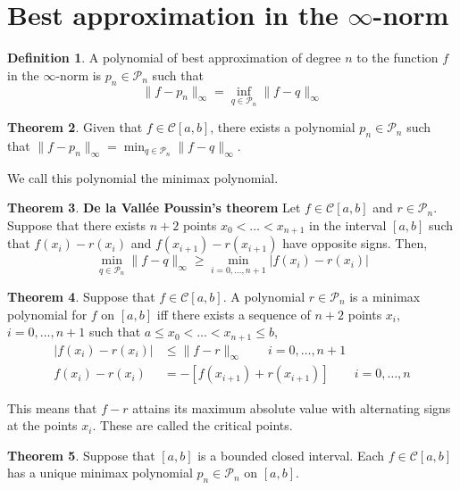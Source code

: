 \documentclass[12pt, openany]{report}
\theoremstyle{definition}
\newtheorem{thm}{Theorem}[chapter]
\newtheorem{definition}[thm]{Definition}
\begin{document}
\section{Best approximation in the \texorpdfstring{$\infty$}{infinity}-norm}
\begin{definition}
    A polynomial of best approximation of degree $n$ to the function $f$ in the $\infty$-norm is $p_n\in \mathcal{P}_n$ such that 
    \begin{equation}
        \lVert f-p_n\rVert_\infty = \inf_{q\in \mathcal{P}_n} \lVert f-q\rVert_\infty
    \end{equation}
\end{definition}
\begin{thm}
    Given that $f\in \mathcal{C}[a,b]$, there exists a polynomial $p_n\in \mathcal{P}_n$ such that $\lVert f-p_n\rVert_\infty = \min_{q\in \mathcal{P}_n} \lVert f-q\rVert_\infty$.
\end{thm}
We call this polynomial the minimax polynomial.
\begin{thm}\textbf{De la Vall\'ee Poussin's theorem}
    Let $f\in \mathcal{C}[a,b]$ and $r\in \mathcal{P}_n$. Suppose that there exists $n+2$ points $x_0<\dots<x_{n+1}$ in the interval $[a,b]$ such that $f(x_i)-r(x_i)$ and $f(x_{i+1})-r(x_{i+1})$ have opposite signs. Then,
    \begin{equation}
        \min_{q\in \mathcal{P}_n} \lVert f-q\rVert_\infty \ge \min_{i=0,\dots,n+1} |f(x_i)-r(x_i)|
    \end{equation}
\end{thm}
\begin{thm}
    Suppose that $f\in \mathcal{C}[a,b]$. A polynomial $r\in \mathcal{P}_n$ is a minimax polynomial for $f$ on $[a,b]$ iff there exists a sequence of $n+2$ points $x_i$, $i=0,\dots,n+1$ such that $a\le x_0<\dots<x_{n+1}\le b$, 
    \begin{equation}
        \begin{aligned}
            |f(x_i)-r(x_i)| &\le \lVert f-r\rVert_\infty \qquad i=0,\dots,n+1\\
            f(x_i)-r(x_i) &= - [f(x_{i+1})+r(x_{i+1})] \qquad i=0,\dots,n
        \end{aligned}
    \end{equation}
\end{thm}
This means that $f-r$ attains its maximum absolute value with alternating signs at the points $x_i$. These are called the critical points. 
\begin{thm}
    Suppose that $[a,b]$ is a bounded closed interval. Each $f\in \mathcal{C}[a,b]$ has a unique minimax polynomial $p_n\in \mathcal{P}_n$ on $[a,b]$. 
\end{thm}
\end{document}
